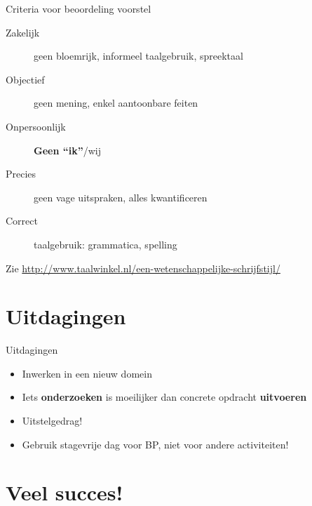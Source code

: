 \documentclass[aspectratio=169]{beamer}
\begin{document}
\begin{frame}{Criteria voor beoordeling voorstel}
  
  
  \begin{description}
    \item[Zakelijk] geen bloemrijk, informeel taalgebruik, spreektaal
    \item[Objectief] geen mening, enkel aantoonbare feiten
    \item[Onpersoonlijk] \textbf{Geen ``ik''}/wij
    \item[Precies] geen vage uitspraken, alles kwantificeren
    \item[Correct] taalgebruik: grammatica, spelling
  \end{description}
  
  Zie \url{http://www.taalwinkel.nl/een-wetenschappelijke-schrijfstijl/}
  
\end{frame}

\section{Uitdagingen}

\begin{frame}{Uitdagingen}
  
  \begin{itemize}
    \item Inwerken in een nieuw domein
    \item Iets \textbf{onderzoeken} is moeilijker dan concrete opdracht \textbf{uitvoeren}
    \item Uitstelgedrag!
    \item Gebruik stagevrije dag voor BP, niet voor andere activiteiten!
  \end{itemize}
  
\end{frame}

\section{Veel succes!}
\end{document}
